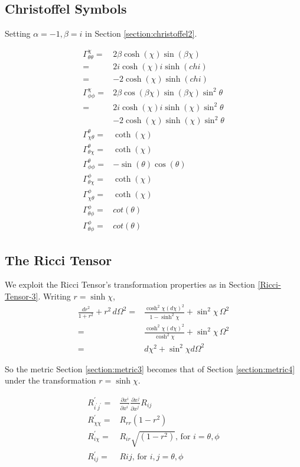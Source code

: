 \documentclass[]{article}
\begin{document}
\subsection{Christoffel Symbols}

Setting $\alpha=-1,\beta=i$ in Section \ref{section:christoffel2}.

\begin{align*}
\Gamma^{\chi}_{\theta\theta}=&2\beta \cosh{(\chi)}\sin{(\beta\chi)}\\
=&2i \cosh{(\chi)}i \sinh{(chi)}\\
=&-2 \cosh{(\chi)} \sinh{(chi)}\\
\Gamma^{\chi}_{\phi\phi}=&2\beta \cos{(\beta\chi)}\sin{(\beta\chi)}\sin^2 \theta\\
=&2i \cosh{(\chi)} i \sinh{(\chi)}\sin^2 \theta\\
&-2 \cosh{(\chi)}  \sinh{(\chi)}\sin^2 \theta\\
\Gamma^{\theta}_{\chi\theta}=&\coth{(\chi)}\\
\Gamma^{\theta}_{\theta\chi}=&\coth{(\chi)}\\
\Gamma^{\theta}_{\phi\phi}=&-\sin{(\theta)}\cos{(\theta)}\\
\Gamma^{\phi}_{\theta\chi}=&\coth{(\chi)}\\
\Gamma^{\phi}_{\chi\theta}=&\coth{(\chi)}\\
\Gamma^{\phi}_{\theta\phi}=&cot{(\theta)}\\
\Gamma^{\phi}_{\theta\phi}=&cot{(\theta)}
\end{align*}

\subsection{The Ricci Tensor}

We exploit the Ricci Tensor's transformation properties as in Section \ref{Ricci-Tensor-3}. Writing $r=\sinh \chi$,
\begin{align*}
\frac{dr^2}{1+r^2}+r^2\,d\Omega^2=&\frac{\cosh^2 \chi (d \chi)^2}{1-\sinh^2 \chi}+\sin^2 \chi\,\Omega^2\\
=&\frac{\cosh^2 \chi (d \chi)^2}{\cosh^2 \chi}+\sin^2 \chi\,\Omega^2\\
=&d\chi^2 + \sin^2 \chi d\Omega^2
\end{align*}

So the metric Section \ref{section:metric3} becomes that of Section \ref{section:metric4} under the transformation $r=\sinh \chi$.

\begin{align*}
R^\prime_{i^\prime j^\prime}=&\frac{\partial x^i}{\partial x^{i^\prime}}\frac{\partial x^j}{\partial x^{j^\prime}}R_{ij}\\
R^\prime_{\chi\chi} =& R_{rr}(1-r^2)\\
R^\prime_{i\chi} =& R_{ir} \sqrt{(1-r^2)}\text{, for $i=\theta,\phi$}\\
R^\prime_{ij} =& R{ij} \text{, for $i,j=\theta,\phi$}
\end{align*} 
\end{document}
